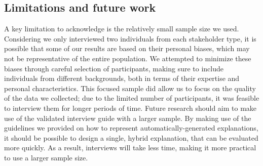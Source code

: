 



\subsection{Limitations and future work}
A key limitation to acknowledge is the relatively small sample size we used. Considering we only interviewed two individuals from each stakeholder type, it is possible that some of our results are based on their personal biases, which may not be representative of the entire population. We attempted to minimize these biases through careful selection of participants, making sure to include individuals from different backgrounds, both in terms of their expertise and personal characteristics. This focused sample did allow us to focus on the quality of the data we collected; due to the limited number of participants, it was feasible to interview them for longer periods of time. Future research should aim to make use of the validated interview guide with a larger sample. By making use of the guidelines we provided on how to represent automatically-generated explanations, it should be possible to design a single, hybrid explanation, that can be evaluated more quickly. As a result, interviews will take less time, making it more practical to use a larger sample size. 

